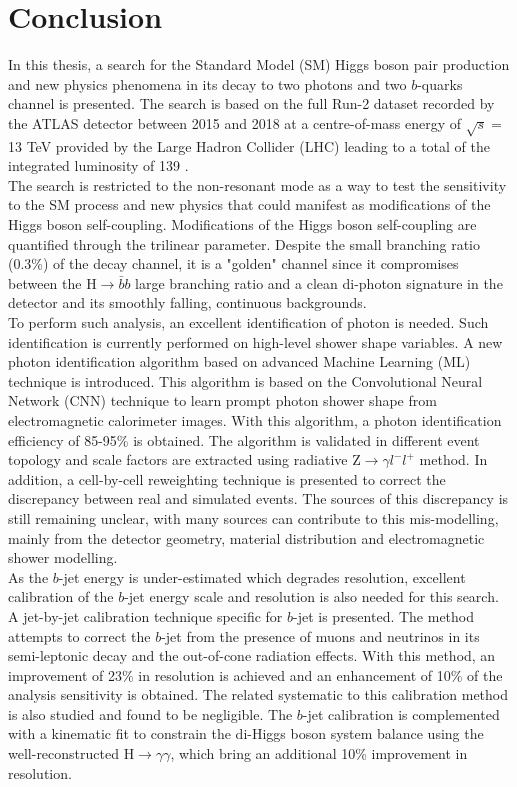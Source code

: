 \chapter{Conclusion}

In this thesis, a search for the Standard Model (SM) Higgs boson pair production and new physics phenomena in its decay to two photons and two $b$-quarks channel is presented. The search is based on the full Run-2 dataset recorded by the ATLAS detector between 2015 and 2018 at a centre-of-mass energy of $\sqrt{s} = $ 13 TeV provided by the Large Hadron Collider (LHC) leading to a total of the integrated luminosity of 139 \ifb.  \\

The search is restricted to the non-resonant mode as a way to test the sensitivity to the SM process and new physics that could manifest as modifications of the Higgs boson self-coupling. Modifications of the Higgs boson self-coupling are quantified through the trilinear \kl parameter. Despite the small branching ratio (0.3\%) of the \bbyy decay channel, it is a "golden" channel since it compromises between the H$\to\bar{b}b$ large branching ratio and a clean di-photon signature in the detector and its smoothly falling, continuous backgrounds. \\

To perform such analysis, an excellent identification of photon is needed. Such identification is currently performed on high-level shower shape variables. A new photon identification algorithm based on advanced Machine Learning (ML) technique is introduced. This algorithm is based on the Convolutional Neural Network (CNN) technique to learn prompt photon shower shape from electromagnetic calorimeter images. With this algorithm, a photon identification efficiency of 85-95\% is obtained. The algorithm is validated in different event topology and scale factors are extracted using radiative Z$\to\gamma l^-l^+$ method. In addition, a cell-by-cell reweighting technique is presented to correct the discrepancy between real and simulated events. The sources of this discrepancy is still remaining unclear, with many sources can contribute to this mis-modelling, mainly from the detector geometry, material distribution and electromagnetic shower modelling. \\

As the $b$-jet energy is under-estimated which degrades \mbb resolution, excellent calibration of the $b$-jet energy scale and resolution is also needed for this search. A jet-by-jet calibration technique specific for $b$-jet is presented. The method attempts to correct the $b$-jet from the presence of muons and neutrinos in its semi-leptonic decay and the out-of-cone radiation effects. With this method, an improvement of 23\% in \mbb resolution is achieved and an enhancement of 10\% of the \HHyybb analysis sensitivity is obtained. The related systematic to this calibration method is also studied and found to be negligible. The $b$-jet calibration is complemented with a kinematic fit to constrain the di-Higgs boson system balance using the well-reconstructed H$\to\gamma\gamma$, which bring an additional 10\% improvement in \mbb resolution. \\

